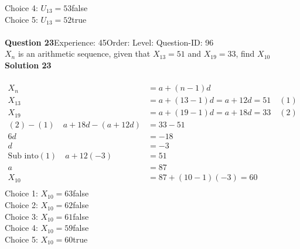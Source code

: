 \documentclass{article}
\begin{document}
Choice 4: \hspace{20pt}$U_{13}=53$\hspace{20pt}false\\
Choice 5: \hspace{20pt}$U_{13}=52$\hspace{20pt}true\\
\\[4pt]
\noindent\textbf{Question 23}\hspace{20pt}Experience: 45\hspace{20pt}Order: \hspace{20pt}Level: \hspace{20pt}Question-ID: 96\\[2pt]
$X_n$ is an arithmetic sequence, given that $X_{13}=51$ and $X_{19}=33$, find $X_{10}$\\[4pt]
\noindent\textbf{Solution 23}\\[2pt]
\\[-35pt]\begin{align*}
X_n&=a+(n-1)d\\[2pt]
X_{13}&=a+(13-1)d=a+12d=51\quad (1)\\[2pt]
X_{19}&=a+(19-1)d=a+18d=33\quad (2)\\[2pt]
(2)-(1)\quad a+18d-(a+12d)&=33-51\\[2pt]
6d&=-18\\[2pt]
d&=-3\\[12pt]
\text{Sub into} (1) \quad a+12(-3)&=51\\[2pt]
a&=87\\[12pt]
X_{10}&=87+(10-1)(-3)=60\\[-40pt]
\end{align*}
Choice 1: \hspace{20pt}$X_{10}=63$\hspace{20pt}false\\
Choice 2: \hspace{20pt}$X_{10}=62$\hspace{20pt}false\\
Choice 3: \hspace{20pt}$X_{10}=61$\hspace{20pt}false\\
Choice 4: \hspace{20pt}$X_{10}=59$\hspace{20pt}false\\
Choice 5: \hspace{20pt}$X_{10}=60$\hspace{20pt}true\\
\end{document}
